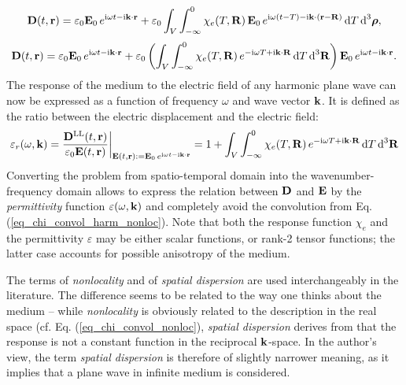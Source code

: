 $$				 \mathbf{D}(t,{\mathbf{r}}) = \varepsilon_0 \mathbf{E}_0 \, e^{{\mathrm i}\omega t - {\mathrm i}{\mathbf{k}}\cdot{\mathbf{r}}} + \varepsilon_0\int_{V} \int_{-\infty}^{0} \chi_e(T, \mathbf{R}) \, \mathbf{E}_0 \, e^{{\mathrm i}\omega (t - T) - {\mathrm i}{\mathbf{k}}\cdot({\mathbf{r}} - \mathbf{R})} \,\mbox{d}T \,\mbox{d}^3\boldsymbol{\rho},$$
$$				 \mathbf{D}(t,{\mathbf{r}}) = \varepsilon_0 \mathbf{E}_0 \, e^{{\mathrm i}\omega t - {\mathrm i}{\mathbf{k}}\cdot{\mathbf{r}}} + \varepsilon_0\left( \int_{V} \int_{-\infty}^{0} \chi_e(T, \mathbf{R})  \, e^{-{\mathrm i}\omega T + {\mathrm i}{\mathbf{k}}\cdot \mathbf{R}}\,\mbox{d}T \,\mbox{d}^3 \mathbf{R} \right) \mathbf{E}_0 \, e^{{\mathrm i}\omega t - {\mathrm i}{\mathbf{k}}\cdot{\mathbf{r}}}.$$
The response of the medium to the electric field of any harmonic plane wave can now be expressed as a function of frequency $\omega$ and wave vector ${\mathbf{k}}$. It is defined as the ratio between the electric displacement and the electric field:
\begin{equation} \varepsilon_r(\omega, {\mathbf{k}}) = \frac{{\mathbf{D}^\text{LL}}(t,{\mathbf{r}})}{\varepsilon_0 \mathbf{E}(t,{\mathbf{r}})} \biggr|_{\mathbf{E}(t, {\mathbf{r}}) := \mathbf{E}_0 \, e^{{\mathrm i}\omega t - {\mathrm i}{\mathbf{k}}\cdot{\mathbf{r}}}} = 1 + \int_{V} \int_{-\infty}^{0} \chi_e(T, \mathbf{R}) \,e^{-{\mathrm i}\omega T + {\mathrm i}{\mathbf{k}}\cdot \mathbf{R}} \,\mbox{d}T \,\mbox{d}^3\mathbf{R} \label{eq_eps_nonloc}\end{equation}
Converting the problem from spatio-temporal domain into the wavenumber-frequency domain allows to express the relation between $\mathbf{D}$ and $\mathbf{E}$ by the \textit{permittivity} function $\varepsilon(\omega, {\mathbf{k}})$ and completely avoid the convolution from Eq. (\ref{eq_chi_convol_harm_nonloc}). Note that both the response function $\chi_e$ and the permittivity $\varepsilon$ %
may be either scalar functions, or rank-2 tensor functions; the latter case accounts for possible anisotropy of the medium.

The terms of \textit{nonlocality} and of \textit{spatial dispersion} are used interchangeably in the literature. The difference seems to be related to the way one thinks about the medium -- while \textit{nonlocality} is obviously related to the description in the real space (cf. Eq. (\ref{eq_chi_convol_nonloc}), \textit{spatial dispersion} derives from that the response is not a constant function in the reciprocal ${\mathbf{k}}$-space. In the author's view, the term \textit{spatial dispersion} is therefore of slightly narrower meaning, as it implies that a plane wave in infinite medium is considered.
